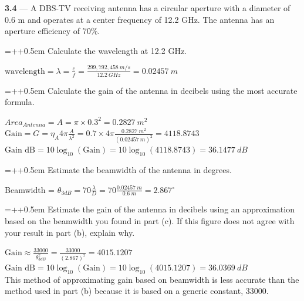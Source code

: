 \documentclass[12pt]{article}
\newcommand{\ans}[1]{\boxed{#1}}
\newcommand{\degree}{\ensuremath{^{\circ}}}
\newlength{\subproblemindent}
\newlength{\subproblemlabelwidth}
\newlength{\solutionindent}
\newcommand{\problem}[2]{\vspace{1em}\noindent\textbf{#1} --- #2\par\vspace{0.25em}}
\newcommand{\subproblem}[2]{%
  \par\vspace{0.25em}%
  \noindent
  \hangindent=\dimexpr\subproblemindent+\subproblemlabelwidth+0.5em\relax
  \hangafter=1
  \hspace*{\subproblemindent}%
  \makebox[\subproblemlabelwidth][l]{\textbf{#1}}#2\par
}
\newcommand{\solution}[1]{%
  \par\vspace{0.0em}%
  \begin{list}{}{
    \setlength{\leftmargin}{\solutionindent}
    \setlength{\rightmargin}{0pt}
    \setlength{\listparindent}{0pt}
    \setlength{\itemindent}{0pt}
    \setlength{\parsep}{0pt}
  }%
    \item\relax
    \begingroup
      \setlength{\baselineskip}{2.0\baselineskip}
      \setlength{\lineskip}{2.0\lineskip}
      \setlength{\parskip}{0pt}
      \everymath{\displaystyle}
      #1
      \par
    \endgroup
  \end{list}%
  \vspace{0.25em}%
}
\begin{document}
\problem{3.4}{A DBS-TV receiving antenna has a circular aperture with a diameter of 0.6 m and operates at a center frequency of 12.2 GHz.
The antenna has an aperture efficiency of 70\%.}
\subproblem{a.}{Calculate the wavelength at 12.2 GHz.}
\solution{
  $\text{wavelength} = \lambda = \frac{c}{f} = \frac{299,792,458\ m/s}{12.2\ GHz} = \ans{0.02457\ m}$
}
\subproblem{b.}{Calculate the gain of the antenna in decibels using the most accurate formula.}
\solution{
  $Area_{Antenna} = A = \pi \times 0.3^2 = 0.2827\ m^2$ \\
  $\text{Gain} = G = \eta_{A}4\pi\frac{A}{\lambda^{2}} = 0.7 \times 4\pi\frac{0.2827\ m^2}{(0.02457\ m)^{2}} = 4118.8743$ \\
  $\text{Gain dB} = 10\log_{10}(\text{Gain}) = 10\log_{10}(4118.8743) = \ans{36.1477\ dB}$
}
\subproblem{c.}{Estimate the beamwidth of the antenna in degrees.}
\solution{Beamwidth = $\theta_{3dB} = 70\frac{\lambda}{D} = 70\frac{0.02457\ m}{0.6\ m} = \ans{2.867\degree}$}
\subproblem{d.}{Estimate the gain of the antenna in decibels using an approximation based on the beamwidth you found in part (c).
If this figure does not agree with your result in part (b), explain why.}
\solution{
  $\text{Gain} \approx \frac{33000}{\theta_{3dB}^2} = \frac{33000}{(2.867)^2} = 4015.1207$ \\
  $\text{Gain dB} = 10\log_{10}(\text{Gain}) = 10\log_{10}(4015.1207) = \ans{36.0369\ dB}$ \\
  This method of approximating gain based on beamwidth is less accurate than the method used in part (b) because it is based on a generic constant, 33000.
}
\end{document}
